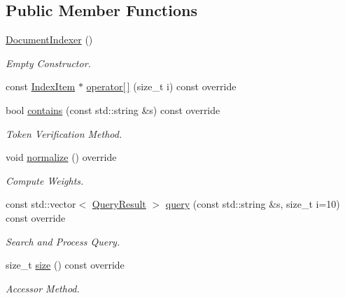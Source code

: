 \subsection*{Public Member Functions}
\begin{DoxyCompactItemize}
\item 
\mbox{\label{class_document_indexer_a44f3c39ee50c32c0226fe98a66f71d07}} 
\hyperlink{class_document_indexer_a44f3c39ee50c32c0226fe98a66f71d07}{Document\+Indexer} ()
\begin{DoxyCompactList}\small\item\em Empty Constructor. \end{DoxyCompactList}\item 
const \hyperlink{class_index_item}{Index\+Item} $\ast$ \hyperlink{class_document_indexer_a68178124d9e7e30a60725483300a73ee}{operator\mbox{[}$\,$\mbox{]}} (size\+\_\+t i) const override
\item 
bool \hyperlink{class_document_indexer_a4bd5fd7be55de9932933dd6f7bfa7d9f}{contains} (const std\+::string \&s) const override
\begin{DoxyCompactList}\small\item\em Token Verification Method. \end{DoxyCompactList}\item 
void \hyperlink{class_document_indexer_a5e0aeb92576847e9462670693cb0737c}{normalize} () override
\begin{DoxyCompactList}\small\item\em Compute Weights. \end{DoxyCompactList}\item 
const std\+::vector$<$ \hyperlink{class_query_result}{Query\+Result} $>$ \hyperlink{class_document_indexer_af14be24c72be4b3eb165da9c504ec7d1}{query} (const std\+::string \&s, size\+\_\+t i=10) const override
\begin{DoxyCompactList}\small\item\em Search and Process Query. \end{DoxyCompactList}\item 
size\+\_\+t \hyperlink{class_document_indexer_a0c5ab06e1506acc9bbc950e5c563e278}{size} () const override
\begin{DoxyCompactList}\small\item\em Accessor Method. \end{DoxyCompactList}\end{DoxyCompactItemize}
